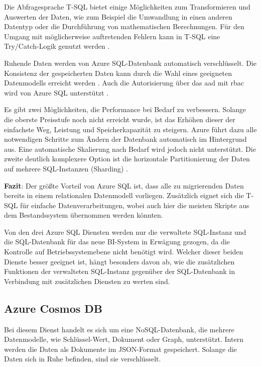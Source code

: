 Die Abfragesprache T-SQL bietet einige Möglichkeiten zum Transformieren und Auswerten der Daten, wie zum Beispiel die Umwandlung in einen anderen Datentyp oder die Durchführung von mathematischen Berechnungen. Für den Umgang mit möglicherweise auftretenden Fehlern kann in T-SQL eine Try/Catch-Logik genutzt werden \cite[vgl.][]{kellenberger_beginning_2021}.

Ruhende Daten werden von Azure SQL-Datenbank automatisch verschlüsselt. Die Konsistenz der gespeicherten Daten kann durch die Wahl eines geeigneten Datenmodells erreicht werden \cite{reagan_web_2018}. Auch die Autorisierung über das \ac{aad} mit \ac{rbac} wird von Azure SQL unterstützt \cite{wolter_authorize_2021}.

Es gibt zwei Möglichkeiten, die Performance bei Bedarf zu verbessern. Solange die oberste Preisstufe noch nicht erreicht wurde, ist das Erhöhen dieser der einfachste Weg, Leistung und Speicherkapazität zu steigern. Azure führt dazu alle notwendigen Schritte zum Ändern der Datenbank automatisch im Hintergrund aus. Eine automatische Skalierung nach Bedarf wird jedoch nicht unterstützt. Die zweite deutlich komplexere Option ist die horizontale Partitionierung der Daten auf mehrere SQL-Instanzen (Sharding) \cite{reagan_web_2018}.

\textbf{Fazit}: Der größte Vorteil von Azure SQL ist, dass alle zu migrierenden Daten bereits in einem relationalen Datenmodell vorliegen. Zusätzlich eignet sich die T-SQL für einfache Datenverarbeitungen, wobei auch hier die meisten Skripte aus dem Bestandssystem übernommen werden könnten.

Von den drei Azure SQL Diensten werden nur die verwaltete SQL-Instanz und die SQL-Datenbank für das neue BI-System in Erwägung gezogen, da die Kontrolle auf Betriebssystemebene nicht benötigt wird. Welcher dieser beiden Dienste besser geeignet ist, hängt besonders davon ab, wie die zusätzlichen Funktionen der verwalteten SQL-Instanz gegenüber der SQL-Datenbank in Verbindung mit zusätzlichen Diensten zu werten sind. 


\subsection{Azure Cosmos DB} \label{sec:grundlagen:azure_dienste:cosmosDB}
Bei diesem Dienst handelt es sich um eine NoSQL-Datenbank, die mehrere Datenmodelle, wie Schlüssel-Wert, Dokument oder Graph, unterstützt. Intern werden die Daten als Dokumente im JSON-Format gespeichert. Solange die Daten sich in Ruhe befinden, sind sie verschlüsselt.

